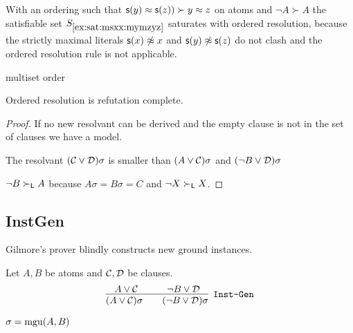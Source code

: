 \begin{example}
	With an ordering such that \(\mathsf{s}(y)\approx\mathsf{s}(z)) \succ y\approx z\) on atoms and \({\lnot A} \succ A\)
	the satisfiable set \(S_{\ref{ex:sat:msxx:mymzyz}}\) saturates with ordered resolution,
	because the strictly maximal literals
	\(\mathsf{s}(x)\not\approx x\) and
	\(\mathsf{s}(y)\not\approx\mathsf{s}(z)\)
	do not clash and the ordered resolution rule is not applicable.
\end{example}


\begin{definition}
	multiset order
\end{definition}

\begin{lemma}
	Ordered resolution is refutation complete.
\end{lemma}

\begin{proof}
	If no new resolvant can be derived and the empty clause is not in the set of clauses we have a model.

	The resolvant \((\mathcal{C}\lor\mathcal{D})\sigma\) is smaller than \((A\lor\mathcal{C})\sigma\) and \((\lnot B\lor\mathcal{D})\sigma\)

	\(\lnot B \succ_{\mathsf{L}} A\) because \(A\sigma=B\sigma=C\) and \(\lnot X\succ_{\mathsf{L}} X\).
\end{proof}

\subsection{InstGen}\label{sec:inst:gen}

Gilmore's prover blindly constructs new ground instances.

\begin{definition}[\InstGen] Let \(A, B\) be atoms and \(\mathcal{C},\mathcal{D}\) be clauses.
	\begin{gather*}
	\infer
	[{\InstGen}]
	{(A\lor\mathcal C)\sigma\qquad (\lnot B\lor\mathcal D)\sigma}
	{A\lor\mathcal C\quad&\quad \lnot B\lor\mathcal D}
	\end{gather*}
	\begin{center}\(\sigma=\operatorname{mgu}(A,B)\)
	\end{center}
\end{definition}

